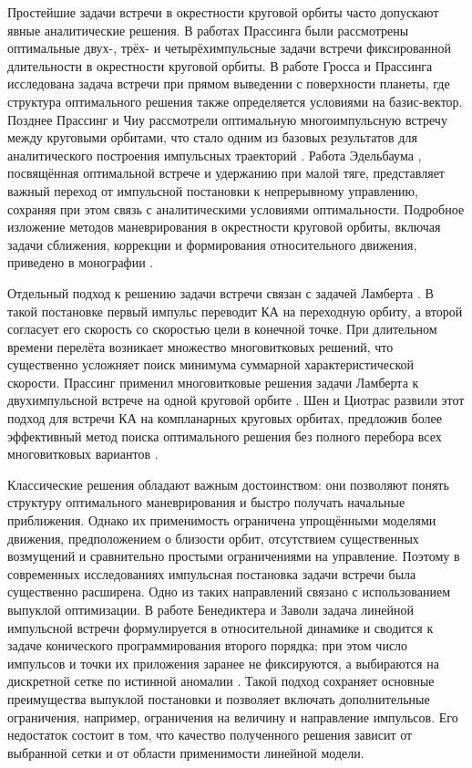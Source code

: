 Простейшие задачи встречи в окрестности круговой орбиты часто допускают явные аналитические решения. В работах Прассинга \cite{prussing1970optimal, prussing1969optimal} были рассмотрены оптимальные двух-, трёх- и четырёхимпульсные задачи встречи фиксированной длительности в окрестности круговой орбиты. В работе Гросса и Прассинга \cite{gross1974optimal} исследована задача встречи при прямом выведении с поверхности планеты, где структура оптимального решения также определяется условиями на базис-вектор. Позднее Прассинг и Чиу рассмотрели оптимальную многоимпульсную встречу между круговыми орбитами, что стало одним из базовых результатов для аналитического построения импульсных траекторий \cite{prussing1986optimal}. Работа Эдельбаума \cite{edelbaum2003optimum}, посвящённая оптимальной встрече и удержанию при малой тяге, представляет важный переход от импульсной постановки к непрерывному управлению, сохраняя при этом связь с аналитическими условиями оптимальности. Подробное изложение методов маневрирования в окрестности круговой орбиты, включая задачи сближения, коррекции и формирования относительного движения, приведено в монографии \cite{баранов2016маневрирование}.

Отдельный подход к решению задачи встречи связан с задачей Ламберта \cite{battin1984elegant, gooding1988solution, estes1970universal, de2018solution}. В такой постановке первый импульс переводит КА на переходную орбиту, а второй согласует его скорость со скоростью цели в конечной точке. При длительном времени перелёта возникает множество многовитковых решений, что существенно усложняет поиск минимума суммарной характеристической скорости. Прассинг применил многовитковые решения задачи Ламберта к двухимпульсной встрече на одной круговой орбите \cite{prussing2000class}. Шен и Циотрас развили этот подход для встречи КА на компланарных круговых орбитах, предложив более эффективный метод поиска оптимального решения без полного перебора всех многовитковых вариантов \cite{shen2003optimal}.

Классические решения обладают важным достоинством: они позволяют понять структуру оптимального маневрирования и быстро получать начальные приближения. Однако их применимость ограничена упрощёнными моделями движения, предположением о близости орбит, отсутствием существенных возмущений и сравнительно простыми ограничениями на управление. Поэтому в современных исследованиях импульсная постановка задачи встречи была существенно расширена. Одно из таких направлений связано с использованием выпуклой оптимизации. В работе Бенедиктера и Заволи задача линейной импульсной встречи формулируется в относительной динамике и сводится к задаче конического программирования второго порядка; при этом число импульсов и точки их приложения заранее не фиксируются, а выбираются на дискретной сетке по истинной аномалии \cite{benedikter2019convex}. Такой подход сохраняет основные преимущества выпуклой постановки и позволяет включать дополнительные ограничения, например, ограничения на величину и направление импульсов. Его недостаток состоит в том, что качество полученного решения зависит от выбранной сетки и от области применимости линейной модели.

